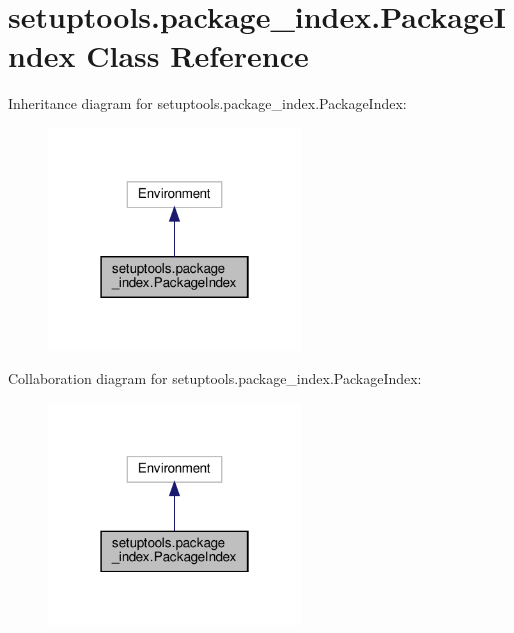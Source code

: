 \hypertarget{classsetuptools_1_1package__index_1_1PackageIndex}{}\section{setuptools.\+package\+\_\+index.\+Package\+Index Class Reference}
\label{classsetuptools_1_1package__index_1_1PackageIndex}


Inheritance diagram for setuptools.\+package\+\_\+index.\+Package\+Index\+:
\nopagebreak
\begin{figure}[H]
\begin{center}
\leavevmode
\includegraphics[width=190pt]{classsetuptools_1_1package__index_1_1PackageIndex__inherit__graph}
\end{center}
\end{figure}


Collaboration diagram for setuptools.\+package\+\_\+index.\+Package\+Index\+:
\nopagebreak
\begin{figure}[H]
\begin{center}
\leavevmode
\includegraphics[width=190pt]{classsetuptools_1_1package__index_1_1PackageIndex__coll__graph}
\end{center}
\end{figure}
